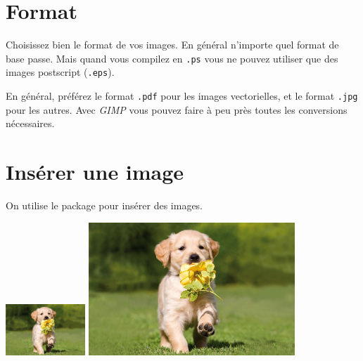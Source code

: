 \documentclass[a4paper, 11pt]{article}
\begin{document}
  \section{Format}

    Choisissez bien le format de vos images. En général n'importe quel format de base passe. Mais quand vous compilez en \verb!.ps! vous ne pouvez utiliser que des images postscript (\verb!.eps!).

    En général, préférez le format \verb!.pdf! pour les images vectorielles, et le format \verb!.jpg! pour les autres. Avec \emph{GIMP} vous pouvez faire à peu près toutes les conversions nécessaires.

    \section{Insérer une image}

    On utilise le package  pour insérer des images.

    \includegraphics[width=3cm]{img/chien.jpg}
    \shortstack{1cm \\ \rule{1cm}{1cm}}
    \includegraphics[height=5cm]{img/chien.jpg}
\end{document}
